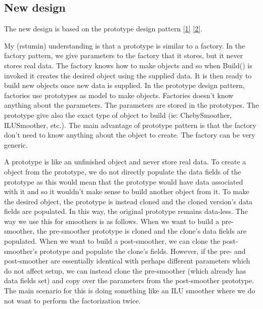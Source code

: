 \subsection{New design}

The new design is based on the prototype design pattern 
\href{http://en.wikipedia.org/wiki/Prototype_pattern}{[1]}
\href{http://www.oodesign.com/prototype-pattern.html}{[2]}.

My (rstumin) understanding is that a prototype is similar to a factory. 
In the factory pattern, we give parameters to the factory that it stores, but it never 
stores real data. The factory knows how to make objects and 
so when Build() is invoked it creates the desired object using 
the supplied data. It is then ready to build new objects once
new data is supplied. 
In the prototype design pattern, factories use prototypes as model to
make objects. Factories doesn't know anything about the
parameters. The parameters are stored in the prototypes.  The
prototype give also the exact type of object to build (ie:
ChebySmoother, ILUSmoother, etc.). 
The main advantage of prototype pattern is that the factory don't need
to know anything about the object to create. The factory can be very
generic.

A prototype is like an unfinished object and never store real data.
To create a object from the prototype, we do not directly populate 
the data fields of the prototype as this would mean that the prototype would have data
associated with it and so it wouldn't make sense to build another
object from it. To make the desired object, the prototype is instead cloned
and the cloned version's data fields are populated. In this way,
the original prototype remains data-less. The way we use this
for smoothers is as follows. When we want to build a pre-smoother, 
the pre-smoother prototype is cloned and the clone's data fields are 
populated. When we want to build a post-smoother, we can clone the 
post-smoother's prototype and populate the clone's fields. However, if 
the pre- and post-smoother are essentially identical with perhaps 
different parameters which do not affect setup, we can instead clone 
the pre-smoother (which already has data fields set) and copy over the 
parameters from the post-smoother prototype.  The main scenario for this 
is doing something like an ILU smoother where we do not want to perform
the factorization twice. 


